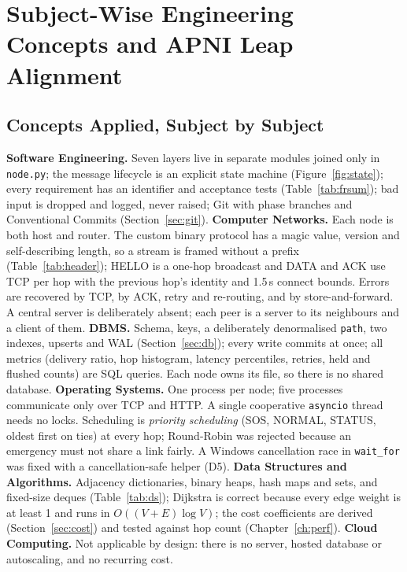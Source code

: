 \section{Subject-Wise Engineering Concepts and APNI Leap Alignment}
\label{ch:subjects}

\subsection{Concepts Applied, Subject by Subject}
\textbf{Software Engineering.} Seven layers live in separate modules joined only in \texttt{node.py}; the message lifecycle is an explicit state machine (Figure~\ref{fig:state}); every requirement has an identifier and acceptance tests (Table~\ref{tab:frsum}); bad input is dropped and logged, never raised; Git with phase branches and Conventional Commits (Section~\ref{sec:git}).
\textbf{Computer Networks.} Each node is both host and router. The custom binary protocol has a magic value, version and self-describing length, so a stream is framed without a prefix (Table~\ref{tab:header}); HELLO is a one-hop broadcast and DATA and ACK use TCP per hop with the previous hop's identity and 1.5\,s connect bounds. Errors are recovered by TCP, by ACK, retry and re-routing, and by store-and-forward. A central server is deliberately absent; each peer is a server to its neighbours and a client of them.
\textbf{DBMS.} Schema, keys, a deliberately denormalised \texttt{path}, two indexes, upserts and WAL (Section~\ref{sec:db}); every write commits at once; all metrics (delivery ratio, hop histogram, latency percentiles, retries, held and flushed counts) are SQL queries. Each node owns its file, so there is no shared database.
\textbf{Operating Systems.} One process per node; five processes communicate only over TCP and HTTP. A single cooperative \texttt{asyncio} thread needs no locks. Scheduling is \emph{priority scheduling} (SOS, NORMAL, STATUS, oldest first on ties) at every hop; Round-Robin was rejected because an emergency must not share a link fairly. A Windows cancellation race in \texttt{wait\_for} was fixed with a cancellation-safe helper (D5).
\textbf{Data Structures and Algorithms.} Adjacency dictionaries, binary heaps, hash maps and sets, and fixed-size deques (Table~\ref{tab:ds}); Dijkstra is correct because every edge weight is at least 1 and runs in $O((V+E)\log V)$; the cost coefficients are derived (Section~\ref{sec:cost}) and tested against hop count (Chapter~\ref{ch:perf}).
\textbf{Cloud Computing.} Not applicable by design: there is no server, hosted database or autoscaling, and no recurring cost.

